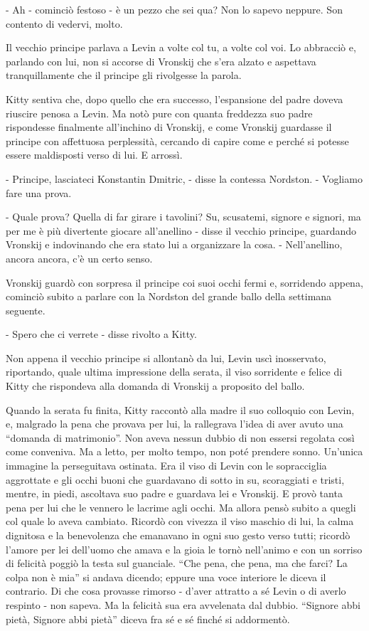 - Ah - cominciò festoso - è un pezzo che sei qua? Non lo sapevo neppure. Son contento di vedervi, molto. 

Il vecchio principe parlava a Levin a volte col tu, a volte col voi. Lo abbracciò e, parlando con lui, non si accorse di Vronskij che s'era alzato e aspettava tranquillamente che il principe gli rivolgesse la parola. 

Kitty sentiva che, dopo quello che era successo, l'espansione del padre doveva riuscire penosa a Levin. Ma notò pure con quanta freddezza suo padre rispondesse finalmente all'inchino di Vronskij, e come Vronskij guardasse il principe con affettuosa perplessità, cercando di capire come e perché si potesse essere maldisposti verso di lui. E arrossì. 

- Principe, lasciateci Konstantin Dmitric, - disse la contessa Nordston. - Vogliamo fare una prova. 

- Quale prova? Quella di far girare i tavolini? Su, scusatemi, signore e signori, ma per me è più divertente giocare all'anellino - disse il vecchio principe, guardando Vronskij e indovinando che era stato lui a organizzare la cosa. - Nell'anellino, ancora ancora, c'è un certo senso. 

Vronskij guardò con sorpresa il principe coi suoi occhi fermi e, sorridendo appena, cominciò subito a parlare con la Nordston del grande ballo della settimana seguente. 

- Spero che ci verrete - disse rivolto a Kitty. 

Non appena il vecchio principe si allontanò da lui, Levin uscì inosservato, riportando, quale ultima impressione della serata, il viso sorridente e felice di Kitty che rispondeva alla domanda di Vronskij a proposito del ballo. 

\label{xv} 

Quando la serata fu finita, Kitty raccontò alla madre il suo colloquio con Levin, e, malgrado la pena che provava per lui, la rallegrava l'idea di aver avuto una ``domanda di matrimonio''. Non aveva nessun dubbio di non essersi regolata così come conveniva. Ma a letto, per molto tempo, non poté prendere sonno. Un'unica immagine la perseguitava ostinata. Era il viso di Levin con le sopracciglia aggrottate e gli occhi buoni che guardavano di sotto in su, scoraggiati e tristi, mentre, in piedi, ascoltava suo padre e guardava lei e Vronskij. E provò tanta pena per lui che le vennero le lacrime agli occhi. Ma allora pensò subito a quegli col quale lo aveva cambiato. Ricordò con vivezza il viso maschio di lui, la calma dignitosa e la benevolenza che emanavano in ogni suo gesto verso tutti; ricordò l'amore per lei dell'uomo che amava e la gioia le tornò nell'animo e con un sorriso di felicità poggiò la testa sul guanciale. ``Che pena, che pena, ma che farci? La colpa non è mia'' si andava dicendo; eppure una voce interiore le diceva il contrario. Di che cosa provasse rimorso - d'aver attratto a sé Levin o di averlo respinto - non sapeva. Ma la felicità sua era avvelenata dal dubbio. ``Signore abbi pietà, Signore abbi pietà'' diceva fra sé e sé finché si addormentò. 

